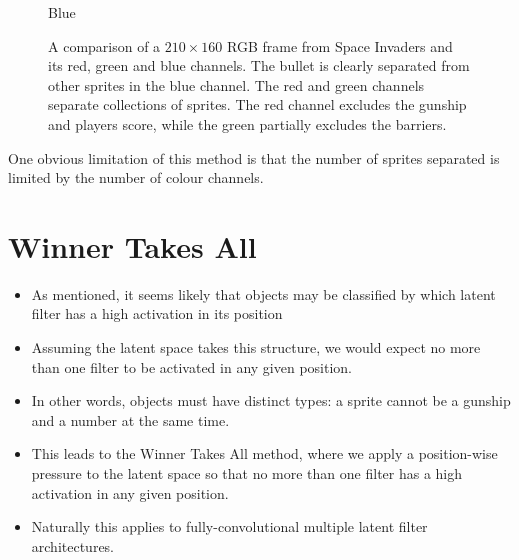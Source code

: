 \begin{figure}[h!]
\begin{multicols}{4}
    \caption{Blue}
\end{multicols}
\caption{A comparison of a $210 \times 160$ RGB frame from Space Invaders and its red, green and blue channels. The bullet is clearly separated from other sprites in the blue channel. The red and green channels separate collections of sprites. The red channel excludes the gunship and players score, while the green partially excludes the barriers.}
\label{fig:separating_colour_spaces}
\end{figure}


One obvious limitation of this method is that the number of sprites separated is limited by the number of colour channels.



%
%
%
%
%
\section{Winner Takes All}

\begin{itemize}
\item As mentioned, it seems likely that objects may be classified by which latent filter has a high activation in its position
\item Assuming the latent space takes this structure, we would expect no more than one filter to be activated in any given position.
\item In other words, objects must have distinct types: a sprite cannot be a gunship and a number at the same time.
\item This leads to the Winner Takes All method, where we apply a position-wise pressure to the latent space so that no more than one filter has a high activation in any given position.
\item Naturally this applies to fully-convolutional multiple latent filter architectures.
\end{itemize}


